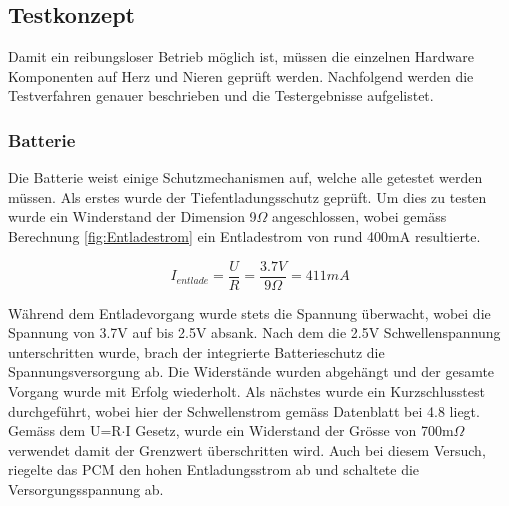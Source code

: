 \subsection{Testkonzept}
Damit ein reibungsloser Betrieb möglich ist, müssen die einzelnen Hardware Komponenten auf Herz und Nieren geprüft werden. Nachfolgend werden die Testverfahren genauer beschrieben und die Testergebnisse aufgelistet.

\subsubsection{Batterie}
Die Batterie weist einige Schutzmechanismen auf, welche alle getestet werden müssen. Als erstes wurde der Tiefentladungsschutz geprüft. Um dies zu testen wurde ein Winderstand der Dimension 9$\Omega$ angeschlossen, wobei gemäss Berechnung \ref{fig:Entladestrom} ein Entladestrom von rund 400mA resultierte.

\begin{equation}
I_{entlade}=\frac{U}{R}=\frac{3.7V}{9\Omega }= 411mA
\label{fig:Entladestrom}
\end{equation}

Während dem Entladevorgang wurde stets die Spannung überwacht, wobei die Spannung von 3.7V auf bis 2.5V absank. Nach dem die 2.5V Schwellenspannung unterschritten wurde, brach der integrierte Batterieschutz die Spannungsversorgung ab. Die Widerstände wurden abgehängt und der gesamte Vorgang wurde mit Erfolg wiederholt.
\newline
Als nächstes wurde ein Kurzschlusstest durchgeführt, wobei hier der Schwellenstrom gemäss Datenblatt bei 4.8 liegt. Gemäss dem U=R$\cdot$I Gesetz, wurde ein Widerstand der Grösse von 700m$\Omega$ verwendet damit der Grenzwert überschritten wird. Auch bei diesem Versuch, riegelte das PCM den hohen Entladungsstrom ab und schaltete die Versorgungsspannung ab.

